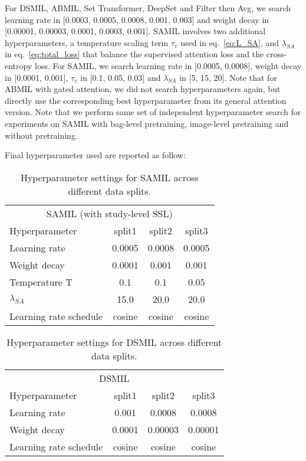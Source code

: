 For DSMIL, ABMIL, Set Transformer, DeepSet and Filter then Avg, we search learning rate in [0.0003, 0.0005, 0.0008, 0.001, 0.003] and weight decay in [0.00001, 0.00003, 0.0001, 0.0003, 0.001]. SAMIL involves two additional hyperparameters, a temperature scaling term $\tau_{v}$ used in eq.~\ref{eq:L_SA}, and $\lambda_{SA}$ in eq.~\ref{eq:total_loss} that balance the supervised attention loss and the cross-entropy loss. For SAMIL, we search learning rate in [0.0005, 0.0008], weight decay in [0.0001, 0.001], $\tau_{v}$ in [0.1, 0.05, 0.03] and $\lambda_{SA}$ in [5, 15, 20]. Note that for ABMIL with gated attention, we did not search hyperparameters again, but directly use the corresponding best hyperparameter from its general attention version. Note that we perform same set of independent hyperparameter search for experiments on SAMIL with bag-level pretraining, image-level pretraining and without pretraining.

Final hyperparameter used are reported as follow:

\begin{table}[H]
\centering
\begin{tabular}{l|c|c|c}
\multicolumn{4}{c}{SAMIL (with study-level SSL)} \\
Hyperparameter & split1 & split2 & split3 \\
\midrule
Learning rate & 0.0005 & 0.0008 & 0.0005 \\
Weight decay & 0.0001 & 0.001 & 0.001 \\
Temperature T & 0.1 & 0.1 & 0.05 \\
$\lambda_{SA}$ & 15.0 & 20.0 & 20.0 \\
Learning rate schedule & cosine & cosine & cosine\\
\end{tabular}
\caption{Hyperparameter settings for SAMIL across different data splits.}
\label{tab:SAMIL_hyper_nopretrain}
\end{table}

\begin{table}[!htb]
\centering
\begin{tabular}{l|c|c|c}
\multicolumn{4}{c}{DSMIL} \\
Hyperparameter & split1 & split2 & split3 \\
\midrule
Learning rate & 0.001 & 0.0008 & 0.0008 \\
Weight decay & 0.0001 & 0.00003 & 0.00001 \\
Learning rate schedule & cosine & cosine & cosine\\
\end{tabular}
\caption{Hyperparameter settings for DSMIL across different data splits.}
\label{tab:DSMIL_hyper}
\end{table}

